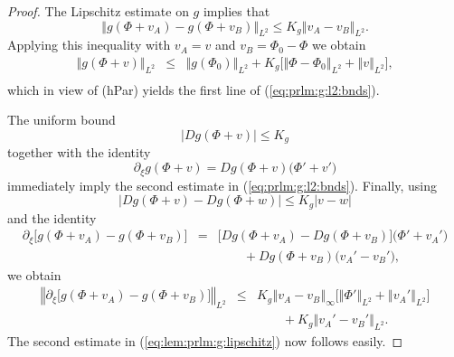 \documentclass[10pt]{articleHJ}
\newcommand{\abs}[1]{\left\vert#1\right\vert}			%
\newcommand{\norm}[1]{\left\Vert#1\right\Vert}		%
\newcommand{\sref}[1]{(\ref{#1})}                       %
\numberwithin{equation}{section}
\begin{document}
\begin{proof}
The Lipschitz estimate on $g$ implies that
\begin{equation}
\norm{ g(\Phi + v_A) - g(\Phi + v_B) }_{L^2}
 \le K_g \norm{v_A - v_B}_{L^2}.
\end{equation}
Applying this inequality with $v_A = v$
and $v_B = \Phi_0 - \Phi$ we obtain
\begin{equation}
\begin{array}{lcl}
\norm{g( \Phi + v) }_{L^2} & \le &
 \norm{ g(\Phi_0 ) }_{L^2}
  + K_{g}
   \big[ \norm{\Phi - \Phi_{0} }_{L^2} + \norm{v}_{L^2}
       \big] ,
\\[0.2cm]
\end{array}
\end{equation}
which in view of (hPar)
yields the first line
of \sref{eq:prlm:g:l2:bnds}.

The uniform bound
\begin{equation}
\abs{ Dg(\Phi + v) } \le K_g
\end{equation}
together with the identity
\begin{equation}
\partial_{\xi} g(\Phi + v) =
  Dg( \Phi  + v) \big( \Phi' + v' \big)
\end{equation}
immediately imply
the second estimate
in \sref{eq:prlm:g:l2:bnds}.
Finally, using
\begin{equation}
\abs{ Dg(\Phi + v)  - Dg(\Phi + w)}
  \le K_{g} \abs{ v - w}
\end{equation}
and the identity
\begin{equation}
\begin{array}{lcl}
 \partial_\xi \big[ g(\Phi + v_A)  - g(\Phi + v_B) \big]
& = & \big[ Dg( \Phi  + v_A) - Dg(\Phi + v_B) \big]
   \big( \Phi' + v_A' \big)
\\[0.2cm]
& & \qquad + Dg(\Phi + v_B) \big( v_A' - v_B' \big) ,
\end{array}
\end{equation}
we obtain
\begin{equation}
\begin{array}{lcl}
\norm{
  \partial_\xi \big[ g(\Phi + v_A)  - g(\Phi + v_B) \big]
}_{L^2}
& \le & K_g \norm{v_A - v_B}_\infty
   \big[ \norm{\Phi'}_{L^2} + \norm{v_A'}_{L^2} \big]
\\[0.2cm]
& & \qquad + K_g \norm{ v_A' - v_B'}_{L^2}.
\end{array}
\end{equation}
The second estimate
in \sref{eq:lem:prlm:g:lipschitz}
now follows easily.
\end{proof}
\end{document}
